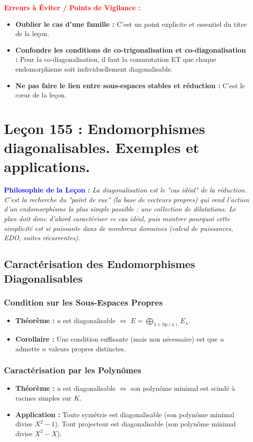 \documentclass[12pt, a4paper, parskip=full]{report}
\theoremstyle{agregstyle}
\newenvironment{philosophie}
  {\par\medskip\noindent\begin{oframed}\noindent\textbf{\textcolor{blue}{Philosophie de la Leçon :}}\itshape}
  {\end{oframed}\par\medskip}
\newenvironment{erreurs}
  {\par\medskip\noindent\begin{oframed}\noindent\textbf{\textcolor{red}{Erreurs à Éviter / Points de Vigilance :}}}
  {\end{oframed}\par\medskip}
\begin{document}
\begin{erreurs}
    \begin{itemize}
        \item \textbf{Oublier le cas d'une famille :} C'est un point explicite et essentiel du titre de la leçon.
        \item \textbf{Confondre les conditions de co-trigonalisation et co-diagonalisation :} Pour la co-diagonalisation, il faut la commutation ET que chaque endomorphisme soit individuellement diagonalisable.
        \item \textbf{Ne pas faire le lien entre sous-espaces stables et réduction :} C'est le cœur de la leçon.
    \end{itemize}
\end{erreurs}
\chapter{Leçon 155 : Endomorphismes diagonalisables. Exemples et applications.}

\begin{philosophie}
    La diagonalisation est le "cas idéal" de la réduction. C'est la recherche du "point de vue" (la base de vecteurs propres) qui rend l'action d'un endomorphisme la plus simple possible : une collection de dilatations. Le plan doit donc d'abord caractériser ce cas idéal, puis montrer pourquoi cette simplicité est si puissante dans de nombreux domaines (calcul de puissances, EDO, suites récurrentes).
\end{philosophie}

\section{Caractérisation des Endomorphismes Diagonalisables}

\subsection{Condition sur les Sous-Espaces Propres}
\begin{itemize}
    \item \textbf{Théorème :} $u$ est diagonalisable $\iff$ $E = \bigoplus_{\lambda \in \mathrm{Sp}(u)} E_\lambda$.
    \item \textbf{Corollaire :} Une condition suffisante (mais non nécessaire) est que $u$ admette $n$ valeurs propres distinctes.
\end{itemize}

\subsection{Caractérisation par les Polynômes}
\begin{itemize}
    \item \textbf{Théorème :} $u$ est diagonalisable $\iff$ son polynôme minimal est scindé à racines simples sur $K$.
    \item \textbf{Application :} Toute symétrie est diagonalisable (son polynôme minimal divise $X^2-1$). Tout projecteur est diagonalisable (son polynôme minimal divise $X^2-X$).
\end{itemize}
\end{document}
